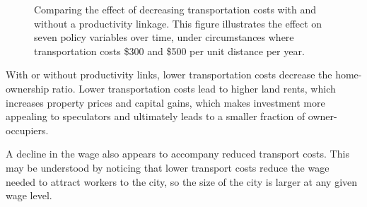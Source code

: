 \begin{figure}[h!tb]
\caption[Decreasing transportation costs with and without linkage]{Comparing the effect of decreasing transportation costs with and without a productivity linkage. This figure illustrates the effect on seven policy variables over time,  under circumstances where transportation costs \$300 and \$500 per unit distance per year.}
\label{fig:Productivity_link_W-WO-transportation-cost}
\end{figure}
With or without productivity links, lower transportation costs decrease the home-ownership ratio. 
Lower transportation costs lead to higher land rents, which increases property prices and  capital gains, which makes investment more appealing to speculators and ultimately leads to a smaller fraction of owner-occupiers.

A decline in the wage also appears to accompany reduced transport costs. This may be understood by noticing that lower transport costs reduce the wage needed to attract workers to the city, so the size of the city is larger at any given wage level. %


